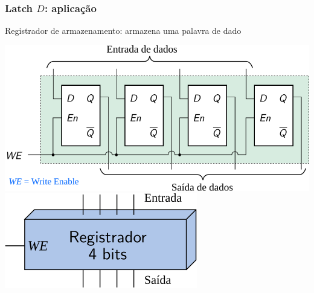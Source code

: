 \documentclass{beamer}
\begin{document}
\begin{frame}
\frametitle{Latch $D$: aplicação}

Registrador de armazenamento: armazena uma palavra de dado\\[6pt]

\begin{center}
\includegraphics[scale=0.8]{images/register}\pause\\[6pt]
\raisebox{24pt}{\Huge=}\hspace{6ex}\pause
\includegraphics{images/register_blackbox}\\
\end{center}

\end{frame}
\end{document}
